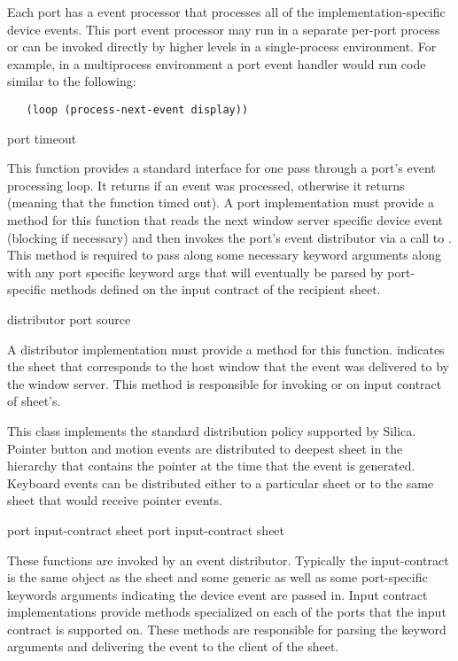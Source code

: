 {Each port has a event processor that processes all of the
implementation-specific device events.  This port event processor may run in a
separate per-port process or can be invoked directly by higher levels in a
single-process environment.  For example, in a multiprocess environment a port
event handler would run code similar to the following:

\begin{verbatim}
   (loop (process-next-event display))
\end{verbatim}

 {port \key timeout}

This function provides a standard interface for one pass through a port's event
processing loop.  It returns  if an event was processed, otherwise it
returns  (meaning that the function timed out).  A port
implementation must provide a method for this function that reads the next
window server specific device event (blocking if necessary) and then invokes the
port's event distributor via a call to .  This
method is required to pass along some necessary keyword arguments along with any
port specific keyword args that will eventually be parsed by port-specific
methods defined on the input contract of the recipient sheet.

 {distributor port source \key \allow}

A distributor implementation must provide a method for this function.
 indicates the sheet that corresponds to the host window that the
event was delivered to by the window server.  This method is responsible for
invoking  or  on input
contract of sheet's.


This class implements the standard distribution policy supported by Silica.
Pointer button and motion events are distributed to deepest sheet in the
hierarchy that contains the pointer at the time that the event is generated.
Keyboard events can be distributed either to a particular sheet or to the same
sheet that would receive pointer events.

 {port input-contract \key sheet \allow}
 {port input-contract \key sheet \allow}

These functions are invoked by an event distributor.  Typically the
input-contract is the same object as the sheet and some generic as well as some
port-specific keywords arguments indicating the device event are passed in.
Input contract implementations provide methods specialized on each of the ports
that the input contract is supported on.  These methods are responsible for
parsing the keyword arguments and delivering the event to the client of the
sheet.


}
